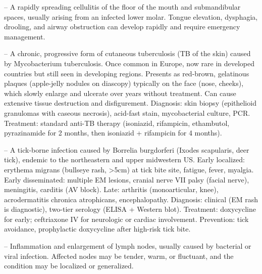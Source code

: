 -- A rapidly spreading cellulitis of the floor of the mouth and submandibular spaces, usually arising from an infected lower molar. Tongue elevation, dysphagia, drooling, and airway obstruction can develop rapidly and require emergency management.

-- A chronic, progressive form of cutaneous tuberculosis (TB of the skin) caused by Mycobacterium tuberculosis. Once common in Europe, now rare in developed countries but still seen in developing regions. Presents as red-brown, gelatinous plaques (apple-jelly nodules on diascopy) typically on the face (nose, cheeks), which slowly enlarge and ulcerate over years without treatment. Can cause extensive tissue destruction and disfigurement. Diagnosis: skin biopsy (epithelioid granulomas with caseous necrosis), acid-fast stain, mycobacterial culture, PCR. Treatment: standard anti-TB therapy (isoniazid, rifampicin, ethambutol, pyrazinamide for 2 months, then isoniazid + rifampicin for 4 months).

-- A tick-borne infection caused by Borrelia burgdorferi (Ixodes scapularis, deer tick), endemic to the northeastern and upper midwestern US. Early localized: erythema migrans (bullseye rash, >5cm) at tick bite site, fatigue, fever, myalgia. Early disseminated: multiple EM lesions, cranial nerve VII palsy (facial nerve), meningitis, carditis (AV block). Late: arthritis (monoarticular, knee), acrodermatitis chronica atrophicans, encephalopathy. Diagnosis: clinical (EM rash is diagnostic), two-tier serology (ELISA + Western blot). Treatment: doxycycline for early; ceftriaxone IV for neurologic or cardiac involvement. Prevention: tick avoidance, prophylactic doxycycline after high-risk tick bite.

-- Inflammation and enlargement of lymph nodes, usually caused by bacterial or viral infection. Affected nodes may be tender, warm, or fluctuant, and the condition may be localized or generalized.

